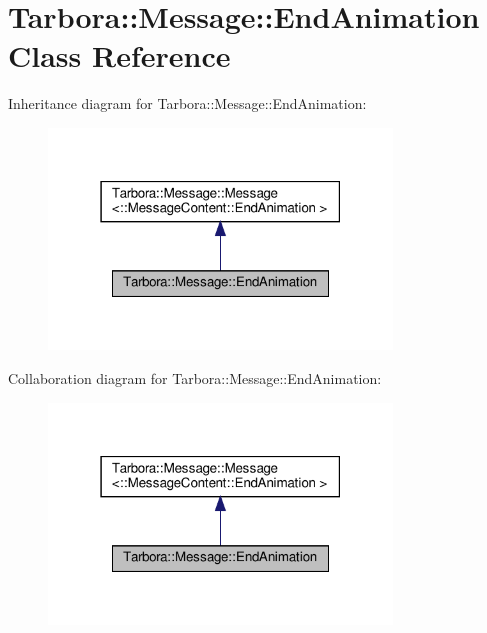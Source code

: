 \hypertarget{classTarbora_1_1Message_1_1EndAnimation}{}\section{Tarbora\+:\+:Message\+:\+:End\+Animation Class Reference}
\label{classTarbora_1_1Message_1_1EndAnimation}


Inheritance diagram for Tarbora\+:\+:Message\+:\+:End\+Animation\+:
\nopagebreak
\begin{figure}[H]
\begin{center}
\leavevmode
\includegraphics[width=259pt]{classTarbora_1_1Message_1_1EndAnimation__inherit__graph}
\end{center}
\end{figure}


Collaboration diagram for Tarbora\+:\+:Message\+:\+:End\+Animation\+:
\nopagebreak
\begin{figure}[H]
\begin{center}
\leavevmode
\includegraphics[width=259pt]{classTarbora_1_1Message_1_1EndAnimation__coll__graph}
\end{center}
\end{figure}
